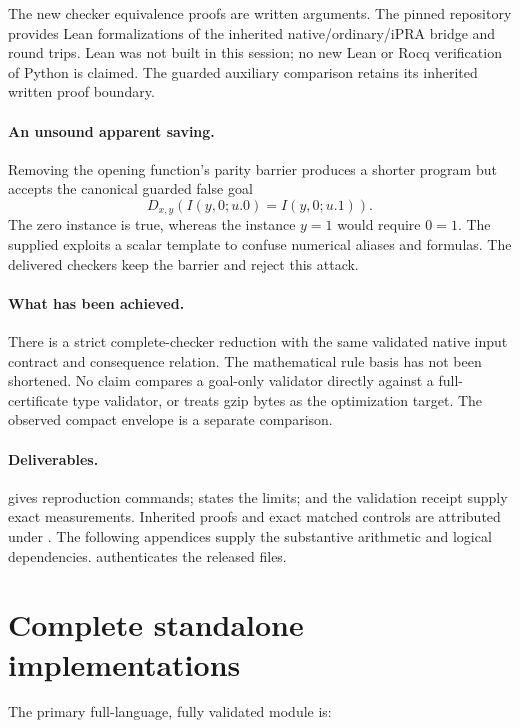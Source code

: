 \documentclass[11pt]{article}
\theoremstyle{definition}\newtheorem{definition}[theorem]{Definition}
\theoremstyle{remark}\newtheorem{remark}[theorem]{Remark}
\begin{document}
The new checker equivalence proofs are written arguments. The
pinned repository provides Lean formalizations of the inherited
native/ordinary/iPRA bridge and round trips. Lean was not built
in this session; no new Lean or Rocq verification of Python is
claimed. The guarded auxiliary comparison retains its inherited
written proof boundary.

\paragraph{An unsound apparent saving.}
Removing the opening function's parity barrier produces a shorter
program but accepts the canonical guarded false goal
\[
            D_{x,y}(I(y,0;u.0)=I(y,0;u.1)).
\]
The zero instance is true, whereas the instance $y=1$ would require
$0=1$. The supplied  exploits a
scalar template to confuse numerical aliases and formulas.
The delivered checkers keep the barrier and reject this attack.

\paragraph{What has been achieved.}
There is a strict complete-checker reduction with the same
validated native input contract and consequence relation.
The mathematical rule basis has not been shortened. No claim
compares a goal-only validator directly against a full-certificate
type validator, or treats gzip bytes as the optimization target.
The observed compact envelope is a separate comparison.

\paragraph{Deliverables.}
 gives reproduction commands;
 states the limits;
 and the validation receipt supply
exact measurements. Inherited proofs and exact matched controls
are attributed under . The following appendices
supply the substantive arithmetic and logical dependencies.
 authenticates the released files.

\section{Complete standalone implementations}

The primary full-language, fully validated module is:

\end{document}
